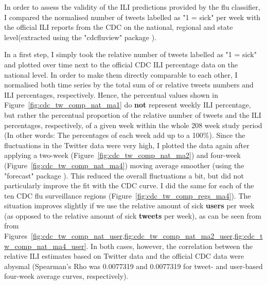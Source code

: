 \documentclass[11pt, a4paper]{article}\usepackage[]{graphicx}\usepackage[]{color}
\begin{document}
In order to assess the validity of the ILI predictions provided by the flu classifier, I compared the normalised number of tweets labelled as "1 = sick" per week with the official ILI reports from the CDC on the national, regional and state level(extracted using the "cdcfluview" package ).\newline

In a first step, I simply took the relative number of tweets labelled as "1 = sick" and plotted over time next to the official CDC ILI percentage data on the national level. In order to make them directly comparable to each other, I normalised both time series by the total sum of or relative tweets numbers and ILI percentages, respectively. Hence, the percentual values shown in Figure~\ref{fig:cdc_tw_comp_nat_ma1} do \textbf{not} represent weekly ILI percentage, but rather the percentual proportion of the relative number of tweets and the ILI percentages, respectively, of a given week within the whole 208 week study period (In other words: The percentages of each week add up to a 100\%). Since the fluctuations in the Twitter data were very high, I plotted the data again after applying a two-week (Figure~\ref{fig:cdc_tw_comp_nat_ma2}) and four-week (Figure~\ref{fig:cdc_tw_comp_nat_ma4}) moving average smoother (using the "forecast" package ). This reduced the overall fluctuations a bit, but did not particularly improve the fit with the CDC curve. I did the same for each of the ten CDC flu surveillance regions (Figure~\ref{fig:cdc_tw_comp_regs_ma4}). The situation improves slightly if we use the relative amount of sick \textbf{users} per week (as opposed to the relative amount of sick \textbf{tweets} per week), as can be seen from from Figures~\ref{fig:cdc_tw_comp_nat_user,fig:cdc_tw_comp_nat_ma2_user,fig:cdc_tw_comp_nat_ma4_user}. In both cases, however, the correlation between the relative ILI estimates based on Twitter data and the official CDC data were abysmal (Spearman's Rho was 0.0077319 and 0.0077319 for tweet- and user-based four-week average curves, respectively).\newline 
\end{document}
